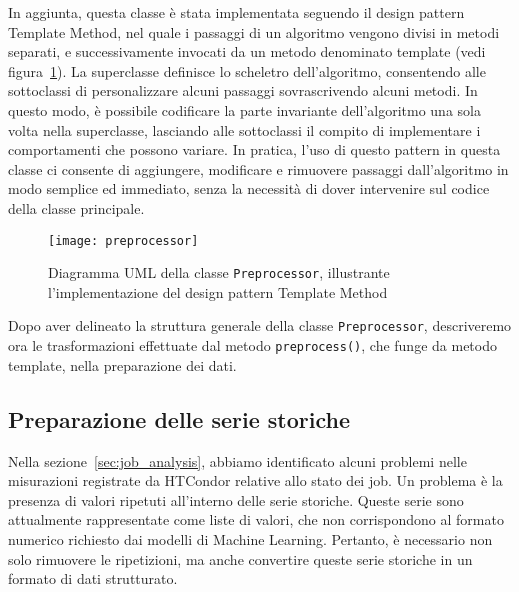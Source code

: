 In aggiunta, questa classe è stata implementata seguendo il design pattern
Template Method, nel quale i passaggi di un algoritmo vengono divisi in metodi
separati, e successivamente invocati da un metodo denominato template (vedi
figura~\ref{fig:uml_preprocessor}). La superclasse definisce lo scheletro
dell'algoritmo, consentendo alle sottoclassi di personalizzare alcuni passaggi
sovrascrivendo alcuni metodi. In questo modo, è possibile codificare la parte
invariante dell'algoritmo una sola volta nella superclasse, lasciando alle
sottoclassi il compito di implementare i comportamenti che possono variare. In
pratica, l'uso di questo pattern in questa classe ci consente di aggiungere,
modificare e rimuovere passaggi dall'algoritmo in modo semplice ed immediato,
senza la necessità di dover intervenire sul codice della classe principale.

\begin{figure}[!ht]
   \centering
   \texttt{[image: preprocessor]}
   \caption{Diagramma UML della classe \texttt{Preprocessor}, illustrante
   l'implementazione del design pattern Template Method}
   \label{fig:uml_preprocessor}
\end{figure}

Dopo aver delineato la struttura generale della classe \texttt{Preprocessor},
descriveremo ora le trasformazioni effettuate dal metodo
\texttt{preprocess()}, che funge da metodo template, nella preparazione dei
dati.

\subsection{Preparazione delle serie storiche}

Nella sezione~\ref{sec:job_analysis}, abbiamo identificato alcuni problemi
nelle misurazioni registrate da HTCondor relative allo stato dei job. Un
problema è la presenza di valori ripetuti all'interno delle serie storiche.
Queste serie sono attualmente rappresentate come liste di valori, che non
corrispondono al formato numerico richiesto dai modelli di Machine Learning.
Pertanto, è necessario non solo rimuovere le ripetizioni, ma anche convertire
queste serie storiche in un formato di dati strutturato.

